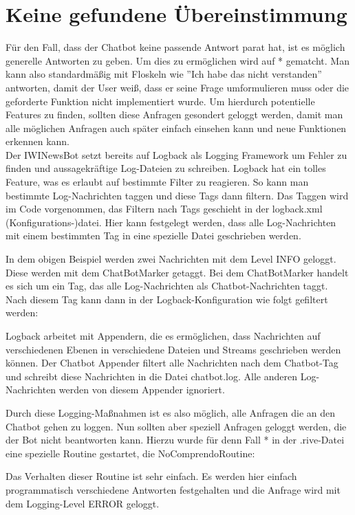 \section{Keine gefundene Übereinstimmung}
Für den Fall, dass der Chatbot keine passende Antwort parat hat, ist es möglich generelle Antworten zu geben. Um dies zu ermöglichen wird auf * gematcht. Man kann also standardmäßig mit Floskeln wie ''Ich habe das nicht verstanden'' antworten, damit der User weiß, dass er seine Frage umformulieren muss oder die geforderte Funktion nicht implementiert wurde. Um hierdurch potentielle Features zu finden, sollten diese Anfragen gesondert geloggt werden, damit man alle möglichen Anfragen auch später einfach einsehen kann und neue Funktionen erkennen kann. \\
Der IWINewsBot setzt bereits auf Logback als Logging Framework um Fehler zu finden und aussagekräftige Log-Dateien zu schreiben. Logback hat ein tolles Feature, was es erlaubt auf bestimmte Filter zu reagieren. So kann man bestimmte Log-Nachrichten taggen und diese Tags dann filtern. Das Taggen wird im Code vorgenommen, das Filtern nach Tags geschieht in der logback.xml (Konfigurations-)datei. Hier kann festgelegt werden, dass alle Log-Nachrichten mit einem bestimmten Tag in eine spezielle Datei geschrieben werden.


In dem obigen Beispiel werden zwei Nachrichten mit dem Level INFO geloggt. Diese werden mit dem ChatBotMarker getaggt. Bei dem ChatBotMarker handelt es sich um ein Tag, das alle Log-Nachrichten als Chatbot-Nachrichten taggt. Nach diesem Tag kann dann in der Logback-Konfiguration wie folgt gefiltert werden:


Logback arbeitet mit Appendern, die es ermöglichen, dass Nachrichten auf verschiedenen Ebenen in verschiedene Dateien und Streams geschrieben werden können. Der Chatbot Appender filtert alle Nachrichten nach dem Chatbot-Tag und schreibt diese Nachrichten in die Datei chatbot.log. Alle anderen Log-Nachrichten werden von diesem Appender ignoriert.

Durch diese Logging-Maßnahmen ist es also möglich, alle Anfragen die an den Chatbot gehen zu loggen. Nun sollten aber speziell Anfragen geloggt werden, die der Bot nicht beantworten kann. Hierzu wurde für denn Fall * in der .rive-Datei eine spezielle Routine gestartet, die NoComprendoRoutine:


Das Verhalten dieser Routine ist sehr einfach. Es werden hier einfach programmatisch verschiedene Antworten festgehalten und die Anfrage wird mit dem Logging-Level ERROR geloggt.
